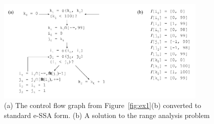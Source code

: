 \documentclass[times]{speauth}
\begin{document}

\begin{figure}[t!]
\begin{center}
\includegraphics[width=0.9\textwidth]{images/ex_standard_eSSA}
\end{center}
\caption{\label{fig:ex_standard_eSSA}
(a) The control flow graph from Figure~\ref{fig:ex1}(b) converted to standard
e-SSA form.
(b) A solution to the range analysis problem
}
\end{figure}


\end{document}
